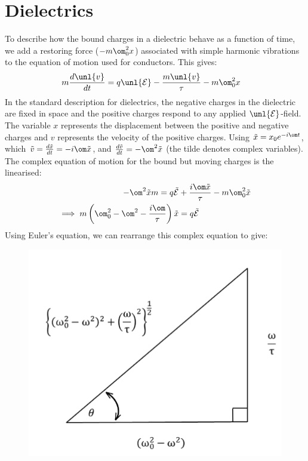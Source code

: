 \documentclass[a4paper, 11pt, normalem]{report}
\renewcommand\E{\mathcal{E}}
\newcommand\uE{\unl{\E}}
\newcommand\tx{\tilde{x}}
\newcommand\tv{\tilde{v}}
\begin{document}
\section{Dielectrics}
To describe how the bound charges in a dielectric behave as a function of time, we add a restoring force ($-m\om_0^2x$) associated with simple harmonic vibrations to the equation of motion  used for conductors.
This gives:
\begin{align}
	m\frac{d\unl{v}}{dt} &= q\uE - \frac{m\unl{v}}{\tau} - m\om_0^2x
\end{align}
In the standard description for dielectrics, the negative charges in the dielectric are fixed in space and the positive charges respond to any applied $\uE$-field.
The variable $x$ represents the displacement between the positive and negative charges and $v$ represents the velocity of the positive charges.
Using $\tx = x_0e^{-i\om t}$, which $\tv = \frac{d\tx}{dt} = -i\om \tx$, and $\frac{d\tv}{dt} = -\om^2\tx$ (the tilde denotes complex variables).
The complex equation of motion for the bound but moving charges is the linearised:
\begin{align}
	-\om^2\tx m = q\tilde{\E} &+ \frac{i\om\tx}{\tau} - m\om_0^2\tx \\
	\implies m\left(\om_0^2 - \om^2 - \frac{i\om}{\tau}\right)\tx &= q\tilde{\E}
\end{align}
Using Euler's equation, we can rearrange this complex equation to give:
\begin{figure}[H]
	\centering
	\includegraphics[scale=0.4]{pyth.png}
\end{figure}
\end{document}
